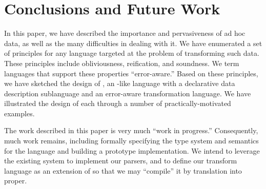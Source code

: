 \section{Conclusions and Future Work}
\label{sec:conclusion}

In this paper, we have described the importance and pervasiveness of ad hoc data, as well as the many difficulties in dealing with it.  We have enumerated a set of principles for any language targeted at the problem of transforming such data.  These principles include obliviousness, reification, and soundness. We term languages that support these properties ``error-aware.''  
Based on these principles, we have sketched the design of \datatype{}, an \ml{}-like language with a declarative data description sublanguage and an error-aware transformation language.   We have illustrated the design of each through a number of practically-motivated examples.

The work described in this paper is very much ``work in progress.''  Consequently, much work remains, including formally specifying the type system and semantics for the language and building a prototype implementation.  We intend to leverage the existing \pads{} system to implement our parsers, and to define our transform language as an extension of \sml{} so that we may ``compile'' it by translation into \sml{} proper. 



